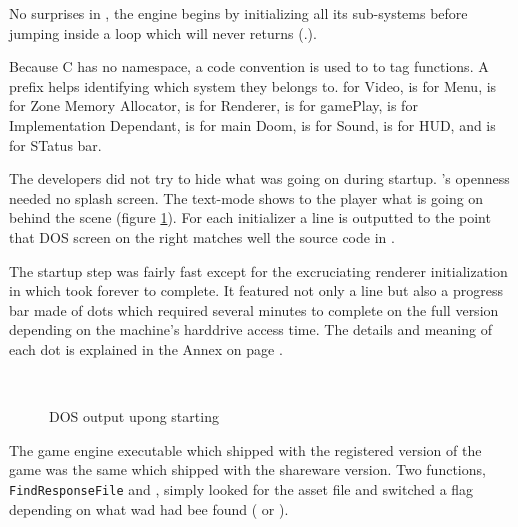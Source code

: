 \par
{}
\par
No surprises in , the engine begins by initializing all its sub-systems before jumping inside a loop which will never returns (.).\\
\par
Because C has no namespace, a code convention is used to to tag functions. A prefix helps identifying which system they belongs to.  for Video,  is for Menu,  is for Zone Memory Allocator,  is for Renderer,  is for gamePlay,  is for Implementation Dependant,  is for main Doom,  is for Sound,  is for HUD, and  is for STatus bar.\\
\par
The developers did not try to hide what was going on during startup. \doom's openness needed no splash screen. The text-mode shows to the player what is going on behind the scene (figure \ref{dosloading}). For each initializer a line is outputted to the point that DOS screen on the right matches well the source code in .\\
\par
The startup step was fairly fast except for the excruciating renderer initialization in  which took forever to complete. It featured not only a line but also a progress bar made of dots which required several minutes to complete on the full version depending on the machine's harddrive access time. The details and meaning of each dot is explained in the Annex on page \pageref{dots_explained}.\\
\par
{}\\
\par
\begin{figure}[H]
\label{dosloading}
\caption{DOS output upong starting }
\end{figure}

\par
The game engine executable which shipped with the registered version of the game was the same which shipped with the shareware version. Two functions, \texttt{\justify FindResponseFile} and , simply looked for the asset file and switched a flag depending on what wad had bee found ( or ).\\
\par
{}




